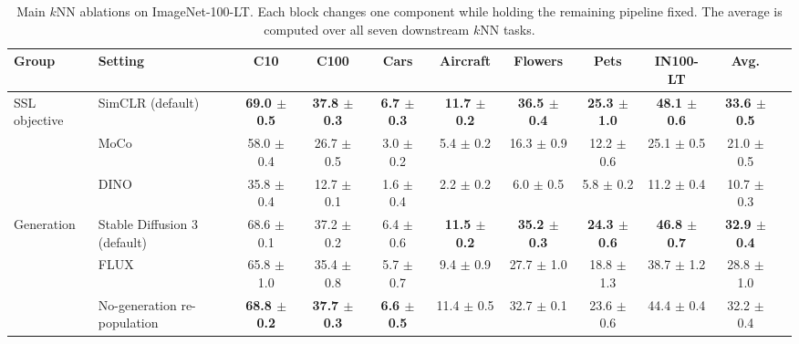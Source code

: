 \begin{table}[t]
\centering
\tiny
\setlength{\tabcolsep}{3.0pt}
\caption{Main $k$NN ablations on ImageNet-100-LT. Each block changes one component while holding the remaining pipeline fixed. The average is computed over all seven downstream $k$NN tasks.}
\label{tab:main_ablation_combined_knn}
\begin{adjustbox}{max width=\textwidth}
\begin{tabular}{l l c c c c c c c c c}
\toprule
Group & Setting & C10 & C100 & Cars & Aircraft & Flowers & Pets & IN100-LT & Avg. \\
\midrule
SSL objective & SimCLR (default) & \textbf{69.0 {\scriptsize$\pm$ 0.5}} & \textbf{37.8 {\scriptsize$\pm$ 0.3}} & \textbf{6.7 {\scriptsize$\pm$ 0.3}} & \textbf{11.7 {\scriptsize$\pm$ 0.2}} & \textbf{36.5 {\scriptsize$\pm$ 0.4}} & \textbf{25.3 {\scriptsize$\pm$ 1.0}} & \textbf{48.1 {\scriptsize$\pm$ 0.6}} & \textbf{33.6 {\scriptsize$\pm$ 0.5}} \\
 & MoCo & 58.0 {\scriptsize$\pm$ 0.4} & 26.7 {\scriptsize$\pm$ 0.5} & 3.0 {\scriptsize$\pm$ 0.2} & 5.4 {\scriptsize$\pm$ 0.2} & 16.3 {\scriptsize$\pm$ 0.9} & 12.2 {\scriptsize$\pm$ 0.6} & 25.1 {\scriptsize$\pm$ 0.5} & 21.0 {\scriptsize$\pm$ 0.5} \\
 & DINO & 35.8 {\scriptsize$\pm$ 0.4} & 12.7 {\scriptsize$\pm$ 0.1} & 1.6 {\scriptsize$\pm$ 0.4} & 2.2 {\scriptsize$\pm$ 0.2} & 6.0 {\scriptsize$\pm$ 0.5} & 5.8 {\scriptsize$\pm$ 0.2} & 11.2 {\scriptsize$\pm$ 0.4} & 10.7 {\scriptsize$\pm$ 0.3} \\
\midrule
Generation & Stable Diffusion 3 (default) & 68.6 {\scriptsize$\pm$ 0.1} & 37.2 {\scriptsize$\pm$ 0.2} & 6.4 {\scriptsize$\pm$ 0.6} & \textbf{11.5 {\scriptsize$\pm$ 0.2}} & \textbf{35.2 {\scriptsize$\pm$ 0.3}} & \textbf{24.3 {\scriptsize$\pm$ 0.6}} & \textbf{46.8 {\scriptsize$\pm$ 0.7}} & \textbf{32.9 {\scriptsize$\pm$ 0.4}} \\
 & FLUX & 65.8 {\scriptsize$\pm$ 1.0} & 35.4 {\scriptsize$\pm$ 0.8} & 5.7 {\scriptsize$\pm$ 0.7} & 9.4 {\scriptsize$\pm$ 0.9} & 27.7 {\scriptsize$\pm$ 1.0} & 18.8 {\scriptsize$\pm$ 1.3} & 38.7 {\scriptsize$\pm$ 1.2} & 28.8 {\scriptsize$\pm$ 1.0} \\
 & No-generation re-population & \textbf{68.8 {\scriptsize$\pm$ 0.2}} & \textbf{37.7 {\scriptsize$\pm$ 0.3}} & \textbf{6.6 {\scriptsize$\pm$ 0.5}} & 11.4 {\scriptsize$\pm$ 0.5} & 32.7 {\scriptsize$\pm$ 0.1} & 23.6 {\scriptsize$\pm$ 0.6} & 44.4 {\scriptsize$\pm$ 0.4} & 32.2 {\scriptsize$\pm$ 0.4} \\

\end{tabular}
\end{adjustbox}
\end{table}
